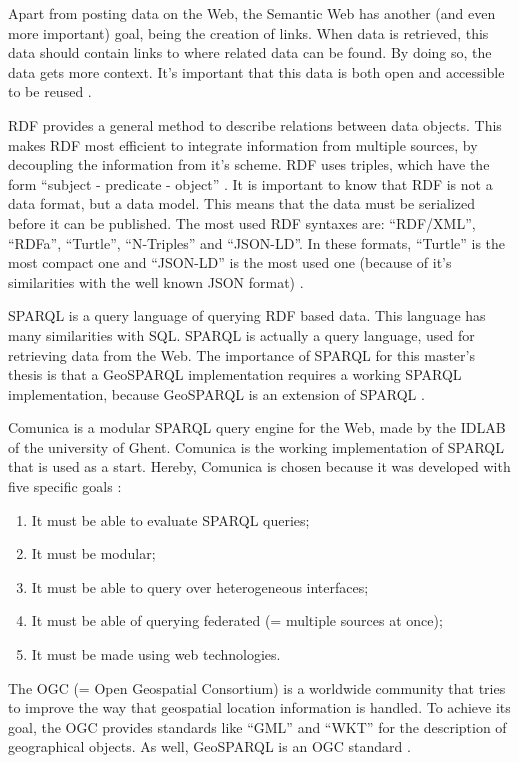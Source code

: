 \documentclass[twocolumn]{phdsymp} %
\begin{document}
Apart from posting data on the Web, the Semantic Web has another (and even more important) goal, being the creation of links. When data is retrieved, this data should contain links to where related data can be found. By doing so, the data gets more context. It's important that this data is both open and accessible to be reused \cite{berners2001semantic}.

RDF provides a general method to describe relations between data objects. This makes RDF most efficient to integrate information from multiple sources, by decoupling the information from it's scheme. RDF uses triples, which have the form ``subject - predicate - object'' \cite{lassila1998resource}. It is important to know that RDF is not a data format, but a data model. This means that the data must be serialized before it can be published. The most used RDF syntaxes are: ``RDF/XML'', ``RDFa'', ``Turtle'', ``N-Triples'' and ``JSON-LD''. In these formats, ``Turtle'' is the most compact one and ``JSON-LD'' is the most used one (because of it's similarities with the well known JSON format) \cite{heath2011linked}.

SPARQL is a query language of querying RDF based data. This language has many similarities with SQL. SPARQL is actually a query language, used for retrieving data from the Web. The importance of SPARQL for this master's thesis is that a GeoSPARQL implementation requires a working SPARQL implementation, because GeoSPARQL is an extension of SPARQL \cite{sparql2013querylanguage}.

Comunica is a modular SPARQL query engine for the Web, made by the IDLAB of the university of Ghent. Comunica is the working implementation of SPARQL that is used as a start. Hereby, Comunica is chosen because it was developed with five specific goals \cite{taelman2018comunica}:
\begin{enumerate}
    \item It must be able to evaluate SPARQL queries; 
    \item It must be modular;
    \item It must be able to query over heterogeneous interfaces;
    \item It must be able of querying federated (= multiple sources at once);
    \item It must be made using web technologies.
\end{enumerate}

The OGC (= Open Geospatial Consortium) is a worldwide community that tries to improve the way that geospatial location information is handled. To achieve its goal, the OGC provides standards like ``GML'' and ``WKT'' for the description of geographical objects. As well, GeoSPARQL is an OGC standard \cite{ogcdocs}.
\end{document}

